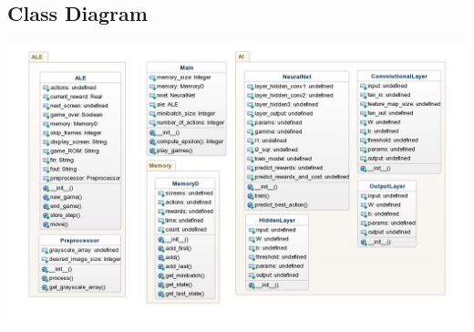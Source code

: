 \documentclass[twoside,letterpaper]{article}
\begin{document}
\clearpage\setcounter{page}{1}\pagestyle{Convertv}
\subsection[Class Diagram]{\rmfamily\bfseries\color{black}
Class Diagram}
{\color{black}
\centering
\includegraphics[width=15cm]{images/jpeg.jpg}\\
}
\end{document}

